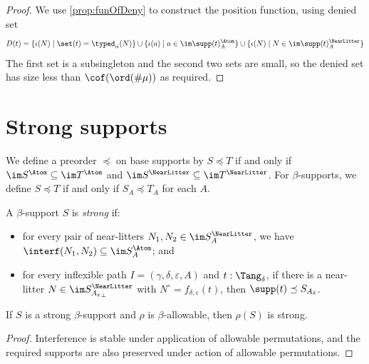 \begin{proof}
  We use \cref{prop:funOfDeny} to construct the position function, using denied set
  \[ D(t) = \{ \iota(N) \mid \set(t) = \typed_\alpha(N) \} \cup \{ \iota(a) \mid a \in \im \supp(t)_A^\Atom \} \cup \{ \iota(N) \mid N \in \im \supp(t)_A^\NearLitter \} \]
  The first set is a subsingleton and the second two sets are small, so the denied set has size less than \( \cof(\ord(\#\mu)) \) as required.
\end{proof}


\section{Strong supports}
\begin{definition}
  \label{def:StrSupport.Occurs}
  \leanok
  We define a preorder \( \preceq \) on base supports by \( S \preceq T \) if and only if \( \im S^\Atom \subseteq \im T^\Atom \) and \( \im S^\NearLitter \subseteq \im T^\NearLitter \).
  For \( \beta \)-supports, we define \( S \preceq T \) if and only if \( S_A \preceq T_A \) for each \( A \).
\end{definition}
\begin{definition}
  \label{def:Strong}
  \leanok
  A \( \beta \)-support \( S \) is \emph{strong} if:
  \begin{itemize}
    \item for every pair of near-litters \( N_1, N_2 \in \im S_A^\NearLitter \), we have \( \interf(N_1, N_2) \subseteq \im S_A^\Atom \); and
    \item for every inflexible path \( I = (\gamma,\delta,\varepsilon,A) \) and \( t : \Tang_\delta \), if there is a near-litter \( N \in \im S_{{A_\varepsilon}_\bot}^\NearLitter \) with \( N^\circ = f_{\delta,\varepsilon}(t) \), then \( \supp(t) \preceq S_{A_\delta} \).
  \end{itemize}
\end{definition}
\begin{proposition}
  \label{prop:Strong.smul}
  \leanok
  If \( S \) is a strong \( \beta \)-support and \( \rho \) is \( \beta \)-allowable, then \( \rho(S) \) is strong.
\end{proposition}
\begin{proof}
  \leanok
  Interference is stable under application of allowable permutations, and the required supports are also preserved under action of allowable permutations.
\end{proof}
